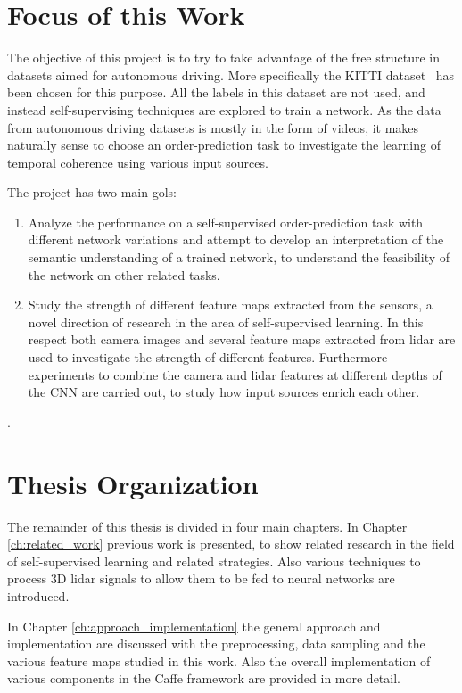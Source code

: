 \section{Focus of this Work}
The objective of this project is to try to take advantage of the free structure in datasets aimed for autonomous driving. More specifically the KITTI dataset~\cite{geiger2012} has been chosen for this purpose. All the labels in this dataset are not used, and instead self-supervising techniques are explored to train a network. As the data from autonomous driving datasets is mostly in the form of videos, it makes naturally sense to choose an order-prediction task to investigate the learning of temporal coherence using various input sources.

The project has two main gols:
\begin{enumerate}
\item Analyze the performance on a self-supervised order-prediction task with different network variations and attempt to develop an interpretation of the semantic understanding of a trained network, to understand the feasibility of the network on other related tasks.
\item Study the strength of different feature maps extracted from the sensors, a novel direction of research in the area of self-supervised learning. In this respect both camera images and several feature maps extracted from lidar are used to investigate the strength of different features. Furthermore experiments to combine the camera and lidar features at different depths of the CNN are carried out, to study how input sources enrich each other.
\end{enumerate}.

\section{Thesis Organization}
The remainder of this thesis is divided in four main chapters. In Chapter \ref{ch:related_work} previous work is presented, to show related research in the field of self-supervised learning and related strategies. Also various techniques to process 3D lidar signals to allow them to be fed to neural networks are introduced. 

In Chapter \ref{ch:approach_implementation} the general approach and implementation are discussed with the preprocessing, data sampling and the various feature maps studied in this work. Also the overall implementation of various components in the Caffe framework are provided in more detail. 

